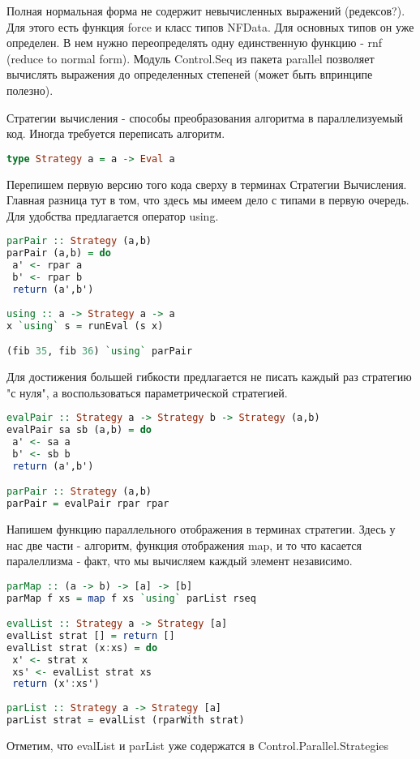 \documentclass[12pt,a4paper]{article}
\begin{document}
Полная нормальная форма не содержит невычисленных выражений (редексов?). Для этого есть функция force и класс типов NFData. Для основных типов он уже определен. В нем нужно переопределять одну единственную функцию - rnf (reduce to normal form). Модуль Control.Seq из пакета parallel позволяет вычислять выражения до определенных степеней (может быть впринципе полезно).

Стратегии вычисления - способы преобразования алгоритма в параллелизуемый код. Иногда требуется переписать алгоритм. 

\begin{lstlisting}[language=Haskell]
type Strategy a = a -> Eval a
\end{lstlisting}

Перепишем первую версию того кода сверху в терминах Стратегии Вычисления. Главная разница тут в том, что здесь мы имеем дело с типами в первую очередь. Для удобства предлагается оператор using.

\begin{lstlisting}[language=Haskell]
parPair :: Strategy (a,b)
parPair (a,b) = do
 a' <- rpar a
 b' <- rpar b
 return (a',b')
 
using :: a -> Strategy a -> a
x `using` s = runEval (s x)

(fib 35, fib 36) `using` parPair
\end{lstlisting}

Для достижения большей гибкости предлагается не писать каждый раз стратегию "с нуля", а воспользоваться параметрической стратегией.

\begin{lstlisting}[language=Haskell]
evalPair :: Strategy a -> Strategy b -> Strategy (a,b)
evalPair sa sb (a,b) = do
 a' <- sa a
 b' <- sb b
 return (a',b')

parPair :: Strategy (a,b)
parPair = evalPair rpar rpar
\end{lstlisting}

Напишем функцию параллельного отображения в терминах стратегии. Здесь у нас две части - алгоритм, функция отображения map, и то что касается паралеллизма - факт, что мы вычисляем каждый элемент независимо.

\begin{lstlisting}[language=Haskell]
parMap :: (a -> b) -> [a] -> [b]
parMap f xs = map f xs `using` parList rseq

evalList :: Strategy a -> Strategy [a]
evalList strat [] = return []
evalList strat (x:xs) = do
 x' <- strat x
 xs' <- evalList strat xs
 return (x':xs')
 
parList :: Strategy a -> Strategy [a]
parList strat = evalList (rparWith strat)
\end{lstlisting}

Отметим, что evalList и parList уже содержатся в Control.Parallel.Strategies
\end{document}
